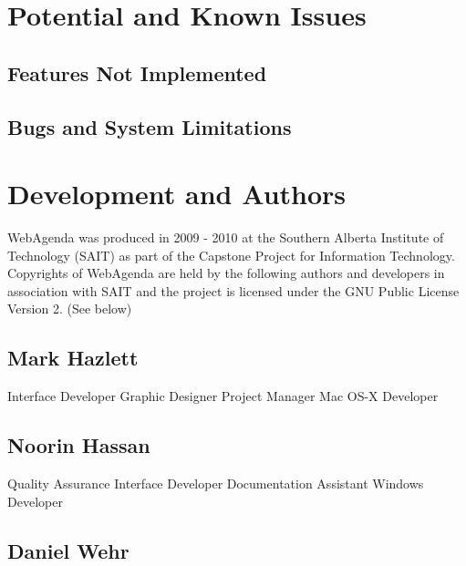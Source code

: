 \documentclass[a4paper,10pt]{report}
\begin{document}
\chapter{Potential and Known Issues}

\section{Features Not Implemented}

\section{Bugs and System Limitations}

\chapter{Development and Authors}

\par \noindent \hspace*{1cm} WebAgenda \textcopyright  \space was produced in 2009 - 2010 at the Southern Alberta Institute of Technology (SAIT) as part of the Capstone Project for Information Technology. Copyrights of WebAgenda are held by the following authors and developers in association with SAIT and the project is licensed under the GNU Public License Version 2. (See below)

\section{Mark Hazlett}


Interface Developer \newline
Graphic Designer \newline
Project Manager \newline
Mac OS-X Developer

\section{Noorin Hassan}

Quality Assurance \newline
Interface Developer \newline
Documentation Assistant \newline
Windows Developer

\section{Daniel Wehr}
\end{document}
